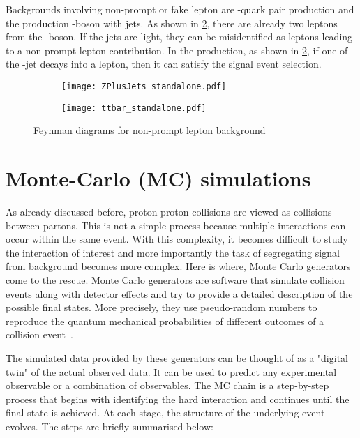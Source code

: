 Backgrounds involving non-prompt or fake lepton are \Ptop-quark pair production 
and the production \PZ-boson with jets. 
As shown in \cref{fig:fakefeynb}, there are already two leptons
from the \PZ-boson. If the jets are light, they can be misidentified as leptons leading to 
a non-prompt lepton contribution.
In the \Ptop{}\APtop production, as shown in \cref{fig:fakefeynb}, if one of the \Pbottom-jet decays 
into a lepton, then it can satisfy the signal event selection.


\begin{figure}[htbp]
  \centering
  \begin{subfigure}{0.45\figwidth}
    \centering
    \texttt{[image: ZPlusJets\_standalone.pdf]}
    \caption{}
    \label{fig:fakefeyna}
  \end{subfigure}
  \begin{subfigure}{0.45\figwidth}
    \centering
    \texttt{[image: ttbar\_standalone.pdf]}
    \caption{}
    \label{fig:fakefeynb}
  \end{subfigure}
  \caption[Feynman diagrams for non-prompt lepton backgrounds]{Feynman diagrams for non-prompt lepton background}
  \label{fig:fakefeyn}
  \end{figure}

\section{Monte-Carlo (MC) simulations}


As already discussed before, proton-proton collisions are viewed as collisions between partons. This is 
not a simple process because multiple interactions can occur within the same event. With this complexity,
it becomes difficult to study the interaction of interest and more importantly the task of 
segregating signal from background becomes more complex. Here is where, Monte Carlo
generators come to the rescue. Monte Carlo generators are software that simulate collision events along with
detector effects and try to provide a detailed description of the possible final states. More precisely,
they use pseudo-random numbers to reproduce the quantum mechanical probabilities of different outcomes
of a collision event~\cite{mcgen}.  

The simulated data provided by these generators can be thought of as a "digital twin"
of the actual observed data. It can be used to predict any experimental observable or a combination of observables.
The MC chain is a step-by-step process that begins with identifying the hard interaction and 
continues until the final state is achieved. At each stage, the structure of the underlying event 
evolves. The steps are briefly summarised below:

